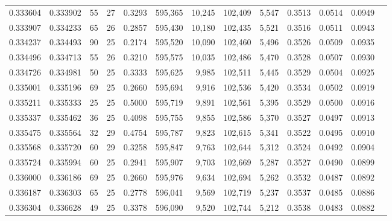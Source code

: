 \begin{tabular}{rrrrrrrrrrrrr}
0.333604 & 0.333902 &  55 &  27 &                                     0.3293 & 595,365 &  10,245 & 102,409 &   5,547 & 0.3513 & 0.0514 & 0.0949 \\
0.333907 & 0.334233 &  65 &  26 &                                     0.2857 & 595,430 &  10,180 & 102,435 &   5,521 & 0.3516 & 0.0511 & 0.0943 \\
0.334237 & 0.334493 &  90 &  25 &                                     0.2174 & 595,520 &  10,090 & 102,460 &   5,496 & 0.3526 & 0.0509 & 0.0935 \\
0.334496 & 0.334713 &  55 &  26 &                                     0.3210 & 595,575 &  10,035 & 102,486 &   5,470 & 0.3528 & 0.0507 & 0.0930 \\
0.334726 & 0.334981 &  50 &  25 &                                     0.3333 & 595,625 &   9,985 & 102,511 &   5,445 & 0.3529 & 0.0504 & 0.0925 \\
0.335001 & 0.335196 &  69 &  25 &                                     0.2660 & 595,694 &   9,916 & 102,536 &   5,420 & 0.3534 & 0.0502 & 0.0919 \\
0.335211 & 0.335333 &  25 &  25 &                                     0.5000 & 595,719 &   9,891 & 102,561 &   5,395 & 0.3529 & 0.0500 & 0.0916 \\
0.335337 & 0.335462 &  36 &  25 &                                     0.4098 & 595,755 &   9,855 & 102,586 &   5,370 & 0.3527 & 0.0497 & 0.0913 \\
0.335475 & 0.335564 &  32 &  29 &                                     0.4754 & 595,787 &   9,823 & 102,615 &   5,341 & 0.3522 & 0.0495 & 0.0910 \\
0.335568 & 0.335720 &  60 &  29 &                                     0.3258 & 595,847 &   9,763 & 102,644 &   5,312 & 0.3524 & 0.0492 & 0.0904 \\
0.335724 & 0.335994 &  60 &  25 &                                     0.2941 & 595,907 &   9,703 & 102,669 &   5,287 & 0.3527 & 0.0490 & 0.0899 \\
0.336000 & 0.336186 &  69 &  25 &                                     0.2660 & 595,976 &   9,634 & 102,694 &   5,262 & 0.3532 & 0.0487 & 0.0892 \\
0.336187 & 0.336303 &  65 &  25 &                                     0.2778 & 596,041 &   9,569 & 102,719 &   5,237 & 0.3537 & 0.0485 & 0.0886 \\
0.336304 & 0.336628 &  49 &  25 &                                     0.3378 & 596,090 &   9,520 & 102,744 &   5,212 & 0.3538 & 0.0483 & 0.0882 \\

\end{tabular}
